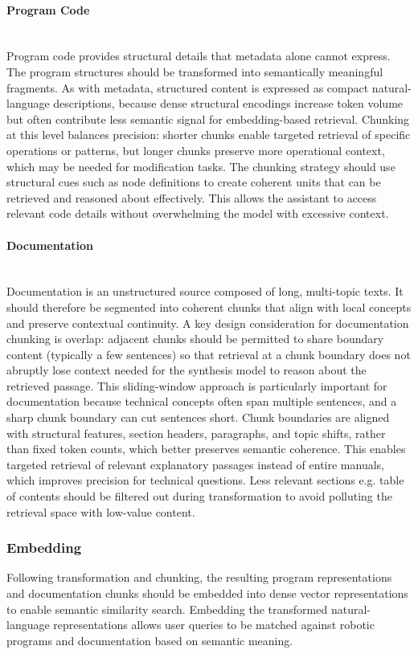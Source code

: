 \paragraph{Program Code}~\\
Program code provides structural details that metadata alone cannot express. The program structures should be transformed into semantically meaningful fragments. As with metadata, structured content is expressed as compact natural-language descriptions, because dense structural encodings increase token volume but often contribute less semantic signal for embedding-based retrieval. Chunking at this level balances precision: shorter chunks enable targeted retrieval of specific operations or patterns, but longer chunks preserve more operational context, which may be needed for modification tasks. The chunking strategy should use structural cues such as node definitions to create coherent units that can be retrieved and reasoned about effectively. This allows the assistant to access relevant code details without overwhelming the model with excessive context.

\paragraph{Documentation}~\\
Documentation is an unstructured source composed of long, multi-topic texts. It should therefore be segmented into coherent chunks that align with local concepts and preserve contextual continuity. A key design consideration for documentation chunking is overlap: adjacent chunks should be permitted to share boundary content (typically a few sentences) so that retrieval at a chunk boundary does not abruptly lose context needed for the synthesis model to reason about the retrieved passage. This sliding-window approach is particularly important for documentation because technical concepts often span multiple sentences, and a sharp chunk boundary can cut sentences short. Chunk boundaries are aligned with structural features, section headers, paragraphs, and topic shifts, rather than fixed token counts, which better preserves semantic coherence. This enables targeted retrieval of relevant explanatory passages instead of entire manuals, which improves precision for technical questions. Less relevant sections e.g. table of contents should be filtered out during transformation to avoid polluting the retrieval space with low-value content.

\subsubsection{Embedding}
Following transformation and chunking, the resulting program representations and documentation chunks should be embedded into dense vector representations to enable semantic similarity search. Embedding the transformed natural-language representations allows user queries to be matched against robotic programs and documentation based on semantic meaning.

